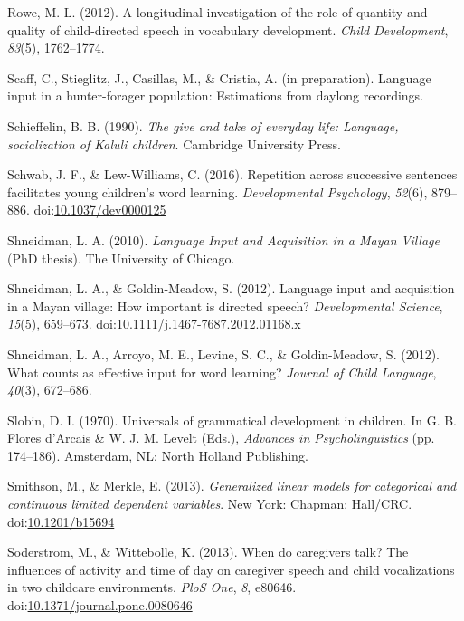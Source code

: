 \documentclass[,man,floatsintext]{apa6}
\begin{document}
\hypertarget{ref-rowe2012longitudinal}{}
Rowe, M. L. (2012). A longitudinal investigation of the role of quantity
and quality of child-directed speech in vocabulary development.
\emph{Child Development}, \emph{83}(5), 1762--1774.

\hypertarget{ref-scaffIPlanguage}{}
Scaff, C., Stieglitz, J., Casillas, M., \& Cristia, A. (in preparation).
Language input in a hunter-forager population: Estimations from daylong
recordings.

\hypertarget{ref-schieffelin1990give}{}
Schieffelin, B. B. (1990). \emph{The give and take of everyday life:
Language, socialization of Kaluli children}. Cambridge University Press.

\hypertarget{ref-schwab2016repetition}{}
Schwab, J. F., \& Lew-Williams, C. (2016). Repetition across successive
sentences facilitates young children's word learning.
\emph{Developmental Psychology}, \emph{52}(6), 879--886.
doi:\href{https://doi.org/10.1037/dev0000125}{10.1037/dev0000125}

\hypertarget{ref-shneidman2010language}{}
Shneidman, L. A. (2010). \emph{Language Input and Acquisition in a Mayan
Village} (PhD thesis). The University of Chicago.

\hypertarget{ref-shneidman2012language}{}
Shneidman, L. A., \& Goldin-Meadow, S. (2012). Language input and
acquisition in a Mayan village: How important is directed speech?
\emph{Developmental Science}, \emph{15}(5), 659--673.
doi:\href{https://doi.org/10.1111/j.1467-7687.2012.01168.x}{10.1111/j.1467-7687.2012.01168.x}

\hypertarget{ref-shneidman2012counts}{}
Shneidman, L. A., Arroyo, M. E., Levine, S. C., \& Goldin-Meadow, S.
(2012). What counts as effective input for word learning? \emph{Journal
of Child Language}, \emph{40}(3), 672--686.

\hypertarget{ref-slobin1970universals}{}
Slobin, D. I. (1970). Universals of grammatical development in children.
In G. B. Flores d'Arcais \& W. J. M. Levelt (Eds.), \emph{Advances in
Psycholinguistics} (pp. 174--186). Amsterdam, NL: North Holland
Publishing.

\hypertarget{ref-smithson2013generalized}{}
Smithson, M., \& Merkle, E. (2013). \emph{Generalized linear models for
categorical and continuous limited dependent variables}. New York:
Chapman; Hall/CRC.
doi:\href{https://doi.org/10.1201/b15694}{10.1201/b15694}

\hypertarget{ref-soderstrom2013when}{}
Soderstrom, M., \& Wittebolle, K. (2013). When do caregivers talk? The
influences of activity and time of day on caregiver speech and child
vocalizations in two childcare environments. \emph{PloS One}, \emph{8},
e80646.
doi:\href{https://doi.org/10.1371/journal.pone.0080646}{10.1371/journal.pone.0080646}
\end{document}
